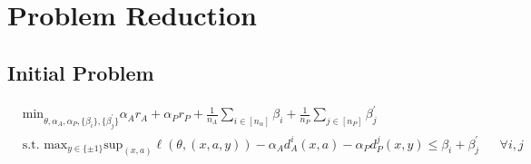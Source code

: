 \documentclass{article}
\begin{document}
    \section*{Problem Reduction}
    \subsection*{Initial Problem}
    \begin{align*}
        &\mathrm{min}_{\theta, \alpha_{A}, \alpha_{P}, \{\beta_i \}, \{\beta_j^\prime \}} \alpha_A r_A + \alpha_P r_P + \frac{1}{n_A} \sum_{i \in [n_\alpha]} \beta_i + \frac{1}{n_P} \sum_{j \in [n_P]} \beta_j^\prime
        \\ &\text{s.t. } \mathrm{max}_{y\in \{\pm 1\} } \mathrm{sup}_{(x, a)} \ell(\theta,(x,a,y))-\alpha_{A}d_{A}^{i}(x,a)-\alpha_{P} d_{P}^{j}(x,y) \le \beta_i + \beta_j^\prime &&\forall i, j
    \end{align*}
\end{document}

